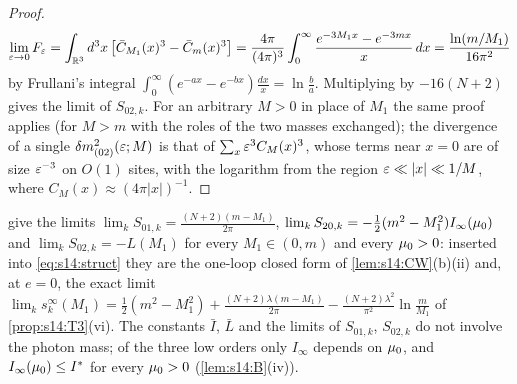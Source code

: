 \begin{proof}
\[
\lim_{\varepsilon\to0}F_{\varepsilon}=\int_{\mathbb R^3}d^3x\,\big[\bar C_{M_1}(x)^3-\bar C_m(x)^3\big]=\frac{4\pi}{(4\pi)^3}\int_0^\infty\frac{e^{-3M_1x}-e^{-3mx}}{x}\,dx=\frac{\ln(m/M_1)}{16\pi^2}
\]
by Frullani's integral $\int_0^\infty(e^{-ax}-e^{-bx})\frac{dx}x=\ln\frac ba$. Multiplying by $-16(N+2)$ gives the limit of $S_{02,k}$. For an arbitrary $M>0$ in place of $M_1$ the same proof applies (for $M>m$ with the roles of the two masses exchanged); the divergence of a single $\delta m^2_{(02)}(\varepsilon;M)$ is that of $\sum_x\varepsilon^3C_M(x)^3$, whose terms near $x=0$ are of size $\varepsilon^{-3}$ on $O(1)$ sites, with the logarithm from the region $\varepsilon\ll|x|\ll1/M$, where $C_M(x)\approx(4\pi|x|)^{-1}$.
\end{proof}

\begin{remark}[the one-loop form and the $e=0$ limit]\label{rem:s14:lowlimits}
 give the limits $\lim_kS_{01,k}=\frac{(N+2)(m-M_1)}{2\pi}$, $\lim_kS_{20,k}=-\frac12(m^2-M_1^2)I_\infty(\mu_0)$ and $\lim_kS_{02,k}=-L(M_1)$ for every $M_1\in(0,m)$ and every $\mu_0>0$: inserted into \eqref{eq:s14:struct} they are the one-loop closed form of \cref{lem:s14:CW}(b)(ii) and, at $e=0$, the exact limit $\lim_ks^\infty_k(M_1)=\frac12(m^2-M_1^2)+\frac{(N+2)\lambda(m-M_1)}{2\pi}-\frac{(N+2)\lambda^2}{\pi^2}\ln\frac m{M_1}$ of \cref{prop:s14:T3}(vi). The constants $\bar I$, $\bar L$ and the limits of $S_{01,k}$, $S_{02,k}$ do not involve the photon mass; of the three low orders only $I_\infty$ depends on $\mu_0$, and $I_\infty(\mu_0)\le I^*$ for every $\mu_0>0$ (\cref{lem:s14:B}(iv)).
\end{remark}
